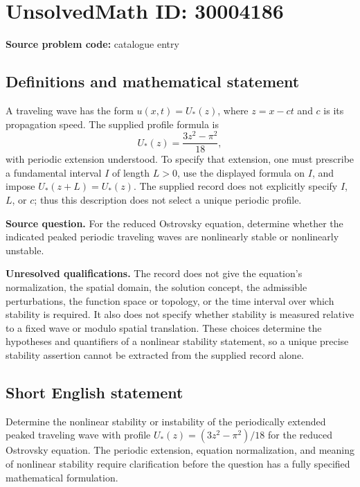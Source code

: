 \documentclass[11pt]{article}
\begin{document}
\section*{UnsolvedMath ID: 30004186}
\textbf{Source problem code:} catalogue entry
\subsection{Definitions and mathematical statement}
A traveling wave has the form \(u(x,t)=U_*(z)\), where \(z=x-ct\) and \(c\) is its propagation speed. The supplied profile formula is
\[
U_*(z)=\frac{3z^2-\pi^2}{18},
\]
with periodic extension understood. To specify that extension, one must prescribe a fundamental interval \(I\) of length \(L>0\), use the displayed formula on \(I\), and impose \(U_*(z+L)=U_*(z)\). The supplied record does not explicitly specify \(I\), \(L\), or \(c\); thus this description does not select a unique periodic profile.

\textbf{Source question.} For the reduced Ostrovsky equation, determine whether the indicated peaked periodic traveling waves are nonlinearly stable or nonlinearly unstable.

\textbf{Unresolved qualifications.} The record does not give the equation's normalization, the spatial domain, the solution concept, the admissible perturbations, the function space or topology, or the time interval over which stability is required. It also does not specify whether stability is measured relative to a fixed wave or modulo spatial translation. These choices determine the hypotheses and quantifiers of a nonlinear stability statement, so a unique precise stability assertion cannot be extracted from the supplied record alone.
\subsection{Short English statement}
Determine the nonlinear stability or instability of the periodically extended peaked traveling wave with profile \(U_*(z)=(3z^2-\pi^2)/18\) for the reduced Ostrovsky equation. The periodic extension, equation normalization, and meaning of nonlinear stability require clarification before the question has a fully specified mathematical formulation.
\end{document}
